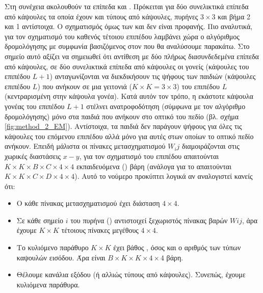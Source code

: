 Στη συνέχεια ακολουθούν τα επίπεδα  και . Πρόκειται για δύο συνελικτικά επίπεδα από κάψουλες τα οποία έχουν  και  τύπους από κάψουλες, πυρήνες $3 \times 3$ και βήμα 2 και 1 αντίστοιχα. Ο σχηματισμός όμως των  και  δεν είναι προφανής. Πιο αναλυτικά, για τον σχηματισμό του καθενός τέτοιου επιπέδου λαμβάνει χώρα ο αλγόριθμος δρομολόγησης με συμφωνία βασιζόμενος στον  που θα αναλύσουμε παρακάτω. Στο σημείο αυτό αξίζει να σημειωθεί ότι αντίθεση με δύο πλήρως διασυνδεδεμένα επίπεδα από κάψουλες, σε δύο συνελικτικά επίπεδα από κάψουλες οι γονείς (κάψουλες του επιπέδου $L + 1$) ανταγωνίζονται να διεκδικήσουν τις ψήφους των παιδιών (κάψουλες επιπέδου $L$) που ανήκουν σε μια γειτονιά ($K\times K = 3 \times 3$) του επιπέδου $L$ (κεντραρισμένη στην κάψουλα γονέα). Κατά αυτόν τον τρόπο, η εκάστοτε κάψουλα γονέας του επιπέδου $L + 1$ στέλνει ανατροφοδότηση (σύμφωνα με τον αλγόριθμο δρομολόγησης) μόνο στα παιδιά που ανήκουν στο οπτικό του πεδίο (βλ. σχήμα \ref{fig:method_2_EM}). Αντίστοιχα, τα παιδιά δεν παράγουν ψήφους για όλες τις κάψουλες του επόμενου επιπέδου αλλά μόνο για αυτές στων οποίων το οπτικό πεδίο ανήκουν. Επειδή μάλιστα οι πίνακες μετασχηματισμού $W_ij$ διαμοιράζονται στις χωρικές διαστάσεις $x-y$, για τον σχηματισμό του επιπέδου  απαιτούνται $K \times K \times B \times C \times 4 \times 4$ εκπαιδευόμενα () βάρη (ανάλογα για το  απαιτούνται $K \times K \times C \times D \times 4 \times 4$). Αυτό το νούμερο προκύπτει λογικά αν αναλογιστεί κανείς ότι:
\begin{itemize}
  \item Ο κάθε πίνακας μετασχηματισμού έχει διάσταση $4 \times 4$. 
  \item Σε κάθε σημείο $i$ του πυρήνα () αντιστοιχεί ξεχωριστός πίνακας βαρών $Wij$, άρα έχουμε $K \times K$ τέτοιους πίνακες μεγέθους $4\times 4$.
  \item Το κυλιόμενο παράθυρο $K \times K$ έχει βάθος , όσος και ο αριθμός των τύπων καψουλών εισόδου. Άρα είναι $B \times K \times K \times 4 \times 4$ βάρη.
  \item Θέλουμε  κανάλια εξόδου (ή αλλιώς τύπους από κάψουλες). Συνεπώς, έχουμε  κυλιόμενα παράθυρα.
\end{itemize}  

